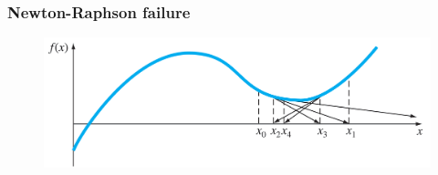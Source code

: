 \documentclass[notes]{beamer}
\begin{document}
\begin{frame}
	\frametitle{Newton-Raphson failure}
	\begin{figure}[ht]
		\centering
		\includegraphics[width=\textwidth]{figs/nr-3.png}
	\end{figure}
\end{frame}
\end{document}
